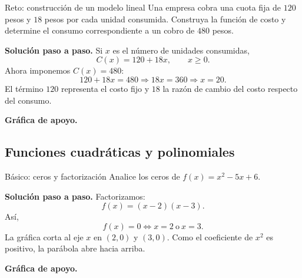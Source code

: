 \documentclass[aspectratio=169,10pt]{beamer}
\begin{document}
\begin{frame}{Reto: construcción de un modelo lineal}
Una empresa cobra una cuota fija de $120$ pesos y $18$ pesos por cada unidad consumida. Construya la función de costo y determine el consumo correspondiente a un cobro de $480$ pesos.

\textbf{Solución paso a paso.} Si $x$ es el número de unidades consumidas,
\[
C(x)=120+18x,\qquad x\ge0.
\]
Ahora imponemos $C(x)=480$:
\[
120+18x=480\Longrightarrow 18x=360\Longrightarrow \boxed{x=20}.
\]
El término $120$ representa el costo fijo y $18$ la razón de cambio del costo respecto del consumo.


\textbf{Gráfica de apoyo.}\medskip
\begin{center}
\end{center}

\end{frame}

\subsection*{Funciones cuadráticas y polinomiales}

\begin{frame}{Básico: ceros y factorización}
Analice los ceros de $f(x)=x^2-5x+6$.

\textbf{Solución paso a paso.} Factorizamos:
\[
f(x)=(x-2)(x-3).
\]
Así,
\[
f(x)=0\Longleftrightarrow x=2\ \text{o}\ x=3.
\]
La gráfica corta al eje $x$ en $(2,0)$ y $(3,0)$. Como el coeficiente de $x^2$ es positivo, la parábola abre hacia arriba.


\textbf{Gráfica de apoyo.}\medskip
\begin{center}
\end{center}

\end{frame}
\end{document}
